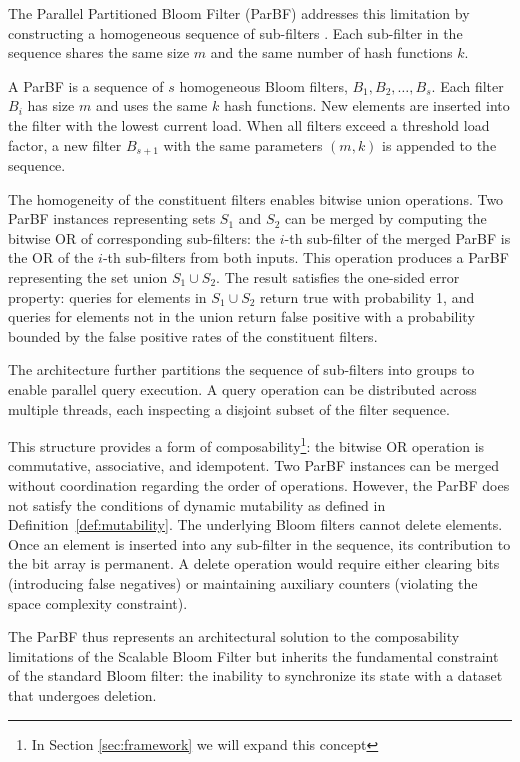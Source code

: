 The Parallel Partitioned Bloom Filter (ParBF) addresses this limitation by constructing a homogeneous sequence of sub-filters \cite{Liu2014ParBFAP}. Each sub-filter in the sequence shares the same size $m$ and the same number of hash functions $k$.

\begin{definition}
    A ParBF is a sequence of $s$ homogeneous Bloom filters, $B_1, B_2, \ldots, B_s$. Each filter $B_i$ has size $m$ and uses the same $k$ hash functions. New elements are inserted into the filter with the lowest current load. When all filters exceed a threshold load factor, a new filter $B_{s+1}$ with the same parameters $(m, k)$ is appended to the sequence.
\end{definition}

The homogeneity of the constituent filters enables bitwise union operations. Two ParBF instances representing sets $S_1$ and $S_2$ can be merged by computing the bitwise OR of corresponding sub-filters: the $i$-th sub-filter of the merged ParBF is the OR of the $i$-th sub-filters from both inputs. This operation produces a ParBF representing the set union $S_1 \cup S_2$. The result satisfies the one-sided error property: queries for elements in $S_1 \cup S_2$ return true with probability 1, and queries for elements not in the union return false positive with a probability bounded by the false positive rates of the constituent filters.

The architecture further partitions the sequence of sub-filters into groups to enable parallel query execution. A query operation can be distributed across multiple threads, each inspecting a disjoint subset of the filter sequence.

This structure provides a form of composability\footnote{In Section \ref{sec:framework} we will expand this concept}: the bitwise OR operation is commutative, associative, and idempotent. Two ParBF instances can be merged without coordination regarding the order of operations. However, the ParBF does not satisfy the conditions of dynamic mutability as defined in Definition~\ref{def:mutability}. The underlying Bloom filters cannot delete elements. Once an element is inserted into any sub-filter in the sequence, its contribution to the bit array is permanent. A delete operation would require either clearing bits (introducing false negatives) or maintaining auxiliary counters (violating the space complexity constraint).

The ParBF thus represents an architectural solution to the composability limitations of the Scalable Bloom Filter but inherits the fundamental constraint of the standard Bloom filter: the inability to synchronize its state with a dataset that undergoes deletion.

